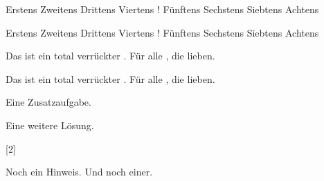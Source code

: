 \documentclass[a4paper]{scrartcl}
\begin{document}
    \begin{aufgabe}[subtitle=Eine Kreuzchenaufgabe,symbol=\symHaken]
        \begin{mcumgebung} %
            \choice Erstens
            \choice Zweitens
            \choice Drittens
            \choice[\mcrichtig] Viertens
            \choice! Fünftens
            \choice[\mcrichtig] Sechstens
            \choice Siebtens
            \choice[\mcrichtig] Achtens
        \end{mcumgebung}
        \begin{loesung}
            \begin{mcumgebung} %
                \choice Erstens
                \choice Zweitens
                \choice Drittens
                \choice[\mcrichtig] Viertens
                \choice! Fünftens
                \choice[\mcrichtig] Sechstens
                \choice Siebtens
                \choice[\mcrichtig] Achtens
            \end{mcumgebung}
        \end{loesung}
        \begin{erwartungen}
        \end{erwartungen}
    \end{aufgabe}

    \begin{aufgabe}[symbol=\symBleistift,subtitle={Lückentext}]
        Das ist ein total verrückter . Für alle , die  lieben.
        \begin{loesung}
            Das ist ein total verrückter . Für alle , die  lieben.
        \end{loesung}
        \begin{erwartungen}
        \end{erwartungen}
    \end{aufgabe}

    \begin{aufgabe*}
        Eine Zusatzaufgabe.
        \begin{loesung*}
            Eine weitere Lösung.
        \end{loesung*}
        \begin{erwartungen}
            [2]
        \end{erwartungen}
        \begin{bearbeitungshinweis}
            Noch ein Hinweis. Und noch einer.
        \end{bearbeitungshinweis}
    \end{aufgabe*}
\end{document}

